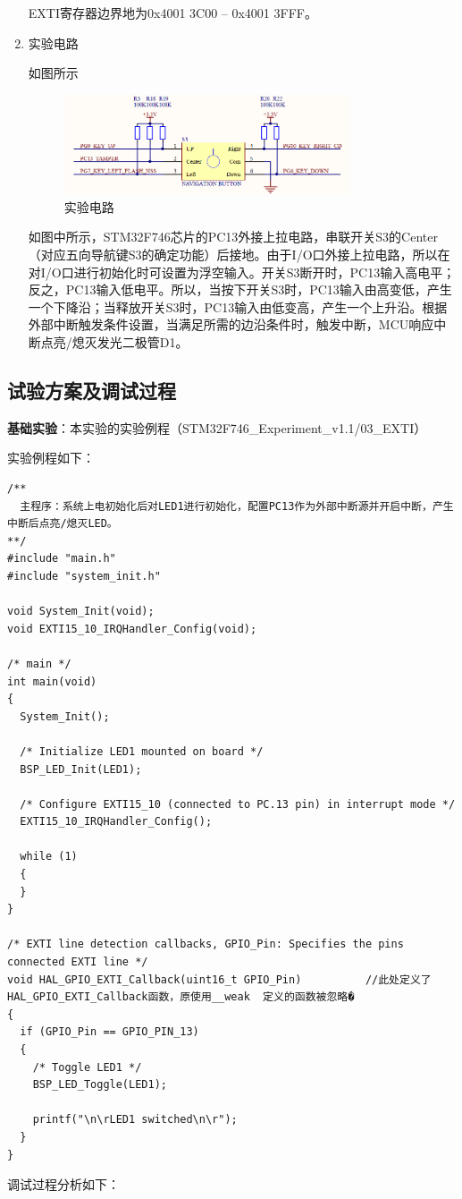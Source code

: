 ﻿\documentclass[UTF8,12pt]{article}
\begin{document}
\begin{enumerate}
  EXTI寄存器边界地为0x4001 3C00 – 0x4001 3FFF。

  \item 实验电路
  
  如图所示

  \begin{figure}[htbp]
    \centering
    \includegraphics[width=0.8\textwidth]{imgs/11.png}
    \caption{实验电路}
  \end{figure}

  如图中所示，STM32F746芯片的PC13外接上拉电路，串联开关S3的Center（对应五向导航键S3的确定功能）后接地。由于I/O口外接上拉电路，所以在对I/O口进行初始化时可设置为浮空输入。开关S3断开时，PC13输入高电平；反之，PC13输入低电平。所以，当按下开关S3时，PC13输入由高变低，产生一个下降沿；当释放开关S3时，PC13输入由低变高，产生一个上升沿。根据外部中断触发条件设置，当满足所需的边沿条件时，触发中断，MCU响应中断点亮/熄灭发光二极管D1。
\end{enumerate}

\subsection{试验方案及调试过程}
\noindent
\textbf{基础实验}：本实验的实验例程（STM32F746\_Experiment\_v1.1/03\_EXTI）

实验例程如下：

\begin{lstlisting}[frame=shadowbox]
/**
  主程序：系统上电初始化后对LED1进行初始化，配置PC13作为外部中断源并开启中断，产生中断后点亮/熄灭LED。
**/
#include "main.h"
#include "system_init.h"

void System_Init(void);
void EXTI15_10_IRQHandler_Config(void);

/* main */
int main(void)
{
  System_Init();
  
  /* Initialize LED1 mounted on board */
  BSP_LED_Init(LED1);
  
  /* Configure EXTI15_10 (connected to PC.13 pin) in interrupt mode */
  EXTI15_10_IRQHandler_Config();
  
  while (1)
  {
  }
}

/* EXTI line detection callbacks, GPIO_Pin: Specifies the pins connected EXTI line */
void HAL_GPIO_EXTI_Callback(uint16_t GPIO_Pin)			//此处定义了HAL_GPIO_EXTI_Callback函数，原使用__weak  定义的函数被忽略�
{
  if (GPIO_Pin == GPIO_PIN_13)
  {
    /* Toggle LED1 */
    BSP_LED_Toggle(LED1);
    
    printf("\n\rLED1 switched\n\r");
  }
}
\end{lstlisting}
调试过程分析如下：
\end{document}
